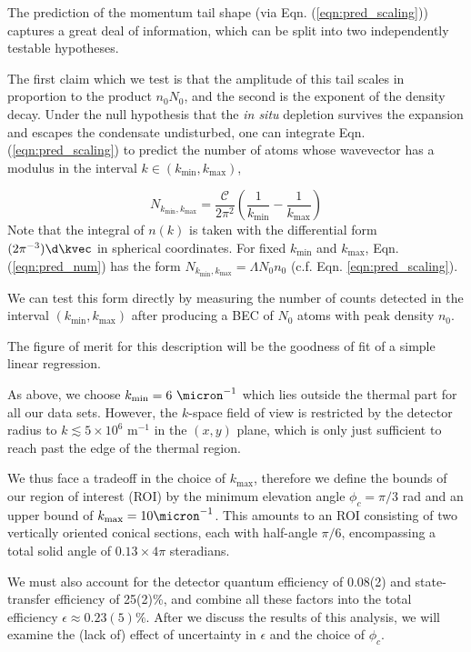 	The prediction of the momentum tail shape (via Eqn.
	(\ref{eqn:pred_scaling})) captures a great deal of information, which can be split into two independently testable hypotheses.
	
	The first claim which we test is that the amplitude of this tail scales in proportion to the product $n_0 N_0$, and the second is the exponent of the density decay.
	Under the null hypothesis that the \emph{in situ} depletion survives the expansion and escapes the condensate undisturbed, one can integrate Eqn.
	(\ref{eqn:pred_scaling}) to predict the number of atoms whose wavevector has a modulus in the interval $k\in (k_\textrm{min}, k_\textrm{max})$, 

	\begin{equation}
		N_{k_\textrm{min},k_\textrm{max}} =\frac{\mathcal{C}}{2\pi^2}\left(\frac{1}{k_\textrm{min}}-\frac{1}{k_\textrm{max}}\right)
		\label{eqn:pred_num}
	\end{equation}
	Note that the integral of $n(k)$ is taken with the differential form $(2\pi^{-3})\d\kvec$ in spherical coordinates.
	For fixed $k_\textrm{min}$ and $k_\textrm{max}$, Eqn.
	(\ref{eqn:pred_num}) has the form $N_{k_\textrm{min},k_\textrm{max}} = \Lambda N_0n_0$ (c.f.
	Eqn.
	\ref{eqn:pred_scaling}).
	
	We can test this form directly by measuring the number of counts detected in the interval $(k_\textrm{min},k_\textrm{max})$ after producing a BEC of $N_0$ atoms with peak density $n_0$.
	
	The figure of merit for this description will be the goodness of fit of a simple linear regression.
	
	As above, we choose $k_\textrm{min}=6~\micron^{-1}$ which lies outside the thermal part for all our data sets.
	However, the $k$-space field of view is restricted by the detector radius to $k\lesssim5\times 10^6$ m$^{-1}$ in the $(x,y)$ plane, which is only just sufficient to reach past the edge of the thermal region.
	
	We thus face a tradeoff in the choice of $k_\textrm{max}$, therefore we define the bounds of our region of interest (ROI) by the minimum elevation angle $\phi_c=\pi/3$ rad and an upper bound of $k_\textrm{max} = 10\micron^{-1}$.
	This amounts to an ROI consisting of two vertically oriented conical sections, each with half-angle $\pi/6$, encompassing a total solid angle of $0.13\times 4\pi$ steradians.
	
	We must also account for the detector quantum efficiency of 0.08(2) and state-transfer efficiency of 25(2)\%, and combine all these factors into the total efficiency $\epsilon\approx0.23(5)\%$.
	After we discuss the results of this analysis, we will  examine the (lack of) effect of uncertainty in $\epsilon$ and the choice of $\phi_c$.
	
